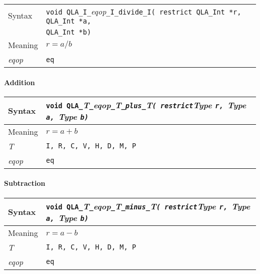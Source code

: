 \documentclass{article}
\newcommand{\tInt}{QLA\ttdash Int }
\newcommand{\namespace}{QLA}
\newcommand{\allNumericTypes}{{\tt I, R, C, V, H, D, M, P}}
\newcommand{\ttdash}{{\tt \_}}
\newcommand{\itt}{\it T}
\newcommand{\extraarg}{}
\begin{document}
\begin{flushleft}
  \begin{tabular}{|l|l|}
  \hline
  Syntax      & {\tt void \namespace}\ttdash{\tt I}\ttdash{\it eqop}\ttdash{\tt I}\ttdash{\tt divide}\ttdash{\tt I}{\tt ( restrict \tInt *r, \tInt *a, }\\
              & {\tt \tInt *b\extraarg)} \\
  \hline
  Meaning     & $r = a/b$ \\
  \hline
  {\it eqop}  & {\tt eq} \\
  \hline
  \end{tabular}
\end{flushleft}

\paragraph{Addition}

\begin{flushleft}
  \begin{tabular}{|l|l|}
  \hline
  Syntax      & {\tt void \namespace}\ttdash\itt\ttdash{\it eqop}\ttdash\itt\ttdash{\tt plus}\ttdash\itt{\tt ( restrict}{\it Type }{\tt *r, }{\it Type }{\tt *a, }{\it Type }{\tt *b\extraarg)} \\
  \hline
  Meaning     & $r = a + b$ \\
  \hline
  \itt        & \allNumericTypes \\
  \hline
  {\it eqop}  & {\tt eq} \\
  \hline
  \end{tabular}
\end{flushleft}

\paragraph{Subtraction}

\begin{flushleft}
  \begin{tabular}{|l|l|}
  \hline
  Syntax      & {\tt void \namespace}\ttdash\itt\ttdash{\it eqop}\ttdash\itt\ttdash{\tt minus}\ttdash\itt{\tt ( restrict}{\it Type }{\tt *r, }{\it Type }{\tt *a, }{\it Type }{\tt *b\extraarg)} \\
  \hline
  Meaning     & $r = a - b$ \\
  \hline
  \itt        & \allNumericTypes \\
  \hline
  {\it eqop}  & {\tt eq} \\
  \hline
  \end{tabular}
\end{flushleft}
\end{document}
